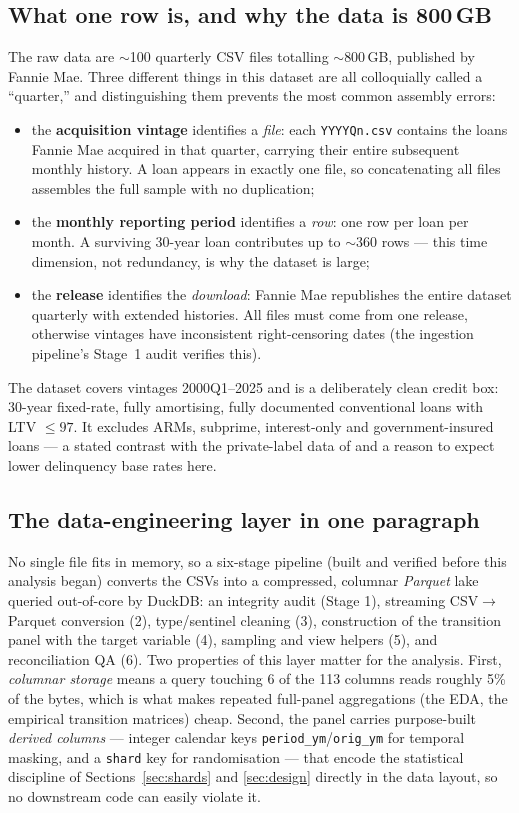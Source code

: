 \documentclass[11pt,a4paper]{article}
\newcommand{\code}[1]{\texttt{#1}}
\begin{document}
\subsection{What one row is, and why the data is 800\,GB}

The raw data are $\sim$100 quarterly CSV files totalling $\sim$800\,GB, published by Fannie Mae. Three different things in this dataset are all colloquially called a ``quarter,'' and distinguishing them prevents the most common assembly errors:
\begin{itemize}[itemsep=1pt]
  \item the \textbf{acquisition vintage} identifies a \emph{file}: each \code{YYYYQn.csv} contains the loans Fannie Mae acquired in that quarter, carrying their entire subsequent monthly history. A loan appears in exactly one file, so concatenating all files assembles the full sample with no duplication;
  \item the \textbf{monthly reporting period} identifies a \emph{row}: one row per loan per month. A surviving 30-year loan contributes up to $\sim$360 rows --- this time dimension, not redundancy, is why the dataset is large;
  \item the \textbf{release} identifies the \emph{download}: Fannie Mae republishes the entire dataset quarterly with extended histories. All files must come from one release, otherwise vintages have inconsistent right-censoring dates (the ingestion pipeline's Stage~1 audit verifies this).
\end{itemize}

The dataset covers vintages 2000Q1--2025 and is a deliberately clean credit box: 30-year fixed-rate, fully amortising, fully documented conventional loans with LTV $\le 97$. It excludes ARMs, subprime, interest-only and government-insured loans --- a stated contrast with the private-label data of \citet{sirignano2021} and a reason to expect lower delinquency base rates here.

\subsection{The data-engineering layer in one paragraph}

No single file fits in memory, so a six-stage pipeline (built and verified before this analysis began) converts the CSVs into a compressed, columnar \emph{Parquet} lake queried out-of-core by DuckDB: an integrity audit (Stage 1), streaming CSV$\to$Parquet conversion (2), type/sentinel cleaning (3), construction of the transition panel with the target variable (4), sampling and view helpers (5), and reconciliation QA (6). Two properties of this layer matter for the analysis. First, \emph{columnar storage} means a query touching 6 of the 113 columns reads roughly 5\% of the bytes, which is what makes repeated full-panel aggregations (the EDA, the empirical transition matrices) cheap. Second, the panel carries purpose-built \emph{derived columns} --- integer calendar keys \code{period\_ym}/\code{orig\_ym} for temporal masking, and a \code{shard} key for randomisation --- that encode the statistical discipline of Sections~\ref{sec:shards} and \ref{sec:design} directly in the data layout, so no downstream code can easily violate it.
\end{document}
